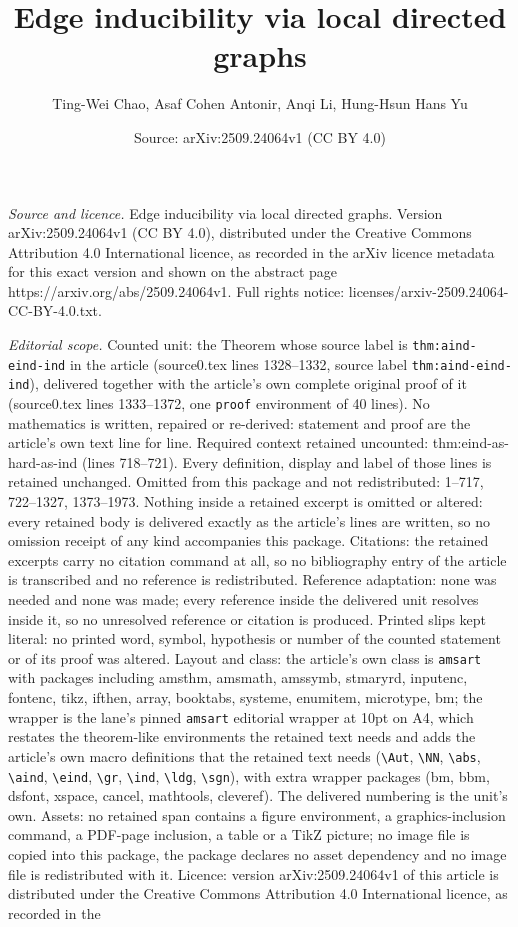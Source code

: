 \documentclass[10pt,a4paper]{amsart}
\title[Edge inducibility via local directed graphs]{Edge inducibility via local directed graphs}
\author{Ting-Wei Chao, Asaf Cohen Antonir, Anqi Li, Hung-Hsun Hans Yu}
\date{Source: arXiv:2509.24064v1 (CC BY 4.0)}
\begin{document}
\maketitle

\noindent\emph{Source and licence.} Edge inducibility via local directed graphs. Version arXiv:2509.24064v1 (CC BY 4.0), distributed under the Creative Commons Attribution 4.0 International licence, as recorded in the arXiv licence metadata for this exact version and shown on the abstract page https://arxiv.org/abs/2509.24064v1. Full rights notice: licenses/arxiv-2509.24064-CC-BY-4.0.txt.\par\smallskip

\noindent\textit{Editorial scope.} Counted unit: the Theorem whose source label is \texttt{thm:aind-eind-ind} in the article (source0.tex lines 1328--1332, source label \texttt{thm:aind-eind-ind}), delivered together with the article's own complete original proof of it (source0.tex lines 1333--1372, one \texttt{proof} environment of 40 lines). No mathematics is written, repaired or re-derived: statement and proof are the article's own text line for line. Required context retained uncounted: thm:eind-as-hard-as-ind (lines 718--721). Every definition, display and label of those lines is retained unchanged. Omitted from this package and not redistributed: 1--717, 722--1327, 1373--1973. Nothing inside a retained excerpt is omitted or altered: every retained body is delivered exactly as the article's lines are written, so no omission receipt of any kind accompanies this package. Citations: the retained excerpts carry no citation command at all, so no bibliography entry of the article is transcribed and no reference is redistributed. Reference adaptation: none was needed and none was made; every reference inside the delivered unit resolves inside it, so no unresolved reference or citation is produced. Printed slips kept literal: no printed word, symbol, hypothesis or number of the counted statement or of its proof was altered. Layout and class: the article's own class is \texttt{amsart} with packages including amsthm, amsmath, amssymb, stmaryrd, inputenc, fontenc, tikz, ifthen, array, booktabs, systeme, enumitem, microtype, bm; the wrapper is the lane's pinned \texttt{amsart} editorial wrapper at 10pt on A4, which restates the theorem-like environments the retained text needs and adds the article's own macro definitions that the retained text needs (\texttt{\textbackslash Aut}, \texttt{\textbackslash NN}, \texttt{\textbackslash abs}, \texttt{\textbackslash aind}, \texttt{\textbackslash eind}, \texttt{\textbackslash gr}, \texttt{\textbackslash ind}, \texttt{\textbackslash ldg}, \texttt{\textbackslash sgn}), with extra wrapper packages (bm, bbm, dsfont, xspace, cancel, mathtools, cleveref). The delivered numbering is the unit's own. Assets: no retained span contains a figure environment, a graphics-inclusion command, a PDF-page inclusion, a table or a TikZ picture; no image file is copied into this package, the package declares no asset dependency and no image file is redistributed with it. Licence: version arXiv:2509.24064v1 of this article is distributed under the Creative Commons Attribution 4.0 International licence, as recorded in the 
\end{document}
